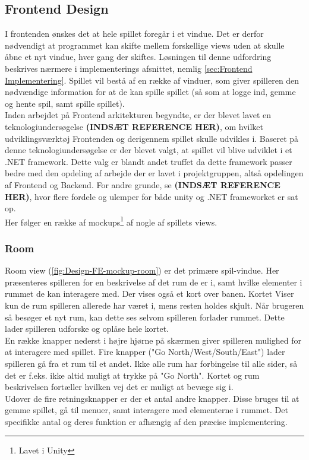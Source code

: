 \subsection{Frontend Design}

I frontenden ønskes det at hele spillet foregår i et vindue. Det er derfor nødvendigt at programmet kan skifte mellem forskellige views uden at skulle åbne et nyt vindue, hver gang der skiftes. Løsningen til denne udfordring beskrives nærmere i implementerings afsnittet, nemlig \autoref{sec:Frontend Implementering}.
Spillet vil bestå af en række af vinduer, som giver spilleren den nødvændige information for at de kan spille spillet (så som at logge ind, gemme og hente spil, samt spille spillet).\\
Inden arbejdet på Frontend arkitekturen begyndte, er der blevet lavet en teknologiundersøgelse \textbf{(INDSÆT REFERENCE HER)}, om hvilket udviklingsværktøj Frontenden og derigennem spillet skulle udvikles i. Baseret på denne teknologiundersøgelse er der blevet valgt, at spillet vil blive udviklet i et .NET framework. Dette valg er blandt andet truffet da dette framework passer bedre med den opdeling af arbejde der er lavet i projektgruppen, altså opdelingen af Frontend og Backend. For andre grunde, se \textbf{(INDSÆT REFERENCE HER)}, hvor flere fordele og ulemper for både unity og .NET frameworket er sat op.\\
Her følger en række af mockups\footnote{Lavet i Unity} af nogle af spillets views.

\subsubsection{Room}

Room view (\autoref{fig:Design-FE-mockup-room}) er det primære spil-vindue. Her præsenteres spilleren for en beskrivelse af det rum de er i, samt hvilke elementer i rummet de kan interagere med. Der vises også et kort over banen. Kortet Viser kun de rum spilleren allerede har været i, mens resten holdes skjult. Når brugeren så besøger et nyt rum, kan dette ses selvom spilleren forlader rummet. Dette lader spilleren udforske og oplåse hele kortet.\\
En række knapper nederst i højre hjørne på skærmen giver spilleren mulighed for at interagere med spillet. Fire knapper ("Go {North/West/South/East}") lader spilleren gå fra et rum til et andet. Ikke alle rum har forbingelse til alle sider, så det er f.eks. ikke altid muligt at trykke på "Go North". Kortet og rum beskrivelsen fortæller hvilken vej det er muligt at bevæge sig i.\\
Udover de fire retningsknapper er der et antal andre knapper. Disse bruges til at gemme spillet, gå til menuer, samt interagere med elementerne i rummet. Det specifikke antal og deres funktion er afhængig af den præcise implementering.

